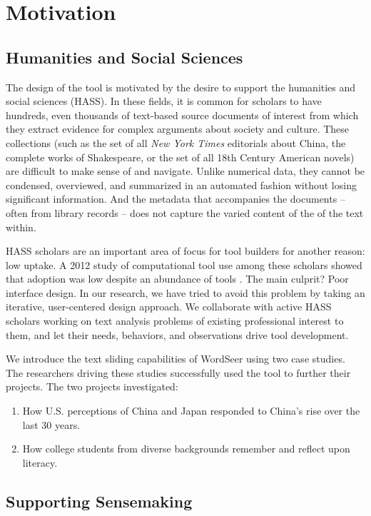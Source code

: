 \documentclass{sig-alternate}
\begin{document}
\section{Motivation}

\subsection{Humanities and Social Sciences}
The design of the tool is motivated by the desire to support the humanities and social sciences (HASS). In these fields, it is common for scholars to have hundreds, even thousands of text-based source documents of interest from which they extract evidence for complex arguments about society and culture. These collections (such as the set of all \emph{New York Times} editorials about China, the complete works of Shakespeare, or the set of all 18th Century American novels)  are difficult to make sense of and navigate. Unlike numerical data, they cannot be condensed, overviewed, and summarized in an automated fashion without losing significant information. And the metadata that accompanies the documents -- often from library records -- does not capture the varied content of the of the text within.

HASS scholars are an important area of focus for tool builders for another reason: low uptake. A 2012 study of computational tool use among these scholars showed that adoption was low despite an abundance of tools \cite{gibbs_building_2012}. The main culprit? Poor interface design. In our research, we have tried to avoid this problem by taking an iterative, user-centered design approach. We collaborate with active HASS scholars working on text analysis problems of existing professional interest to them, and let their needs, behaviors, and observations drive tool development.

We introduce the text sliding capabilities of WordSeer using two case studies. The researchers driving these studies successfully used the tool to further their projects. The two projects investigated:
\begin{enumerate}
	\item How U.S. perceptions of China and Japan responded to China's rise over the last 30 years.
	\item How college students from diverse backgrounds remember and reflect upon literacy.
\end{enumerate}


\subsection{Supporting Sensemaking}
\end{document}
